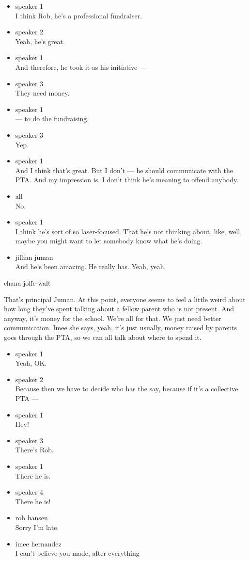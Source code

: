 \begin{itemize}
\item
  speaker 1\\
  I think Rob, he's a professional fundraiser.
\item
  speaker 2\\
  Yeah, he's great.
\item
  speaker 1\\
  And therefore, he took it as his initiative ---
\item
  speaker 3\\
  They need money.
\item
  speaker 1\\
  --- to do the fundraising.
\item
  speaker 3\\
  Yep.
\item
  speaker 1\\
  And I think that's great. But I don't --- he should communicate with
  the PTA. And my impression is, I don't think he's meaning to offend
  anybody.
\item
  all\\
  No.
\item
  speaker 1\\
  I think he's sort of so laser-focused. That he's not thinking about,
  like, well, maybe you might want to let somebody know what he's doing.
\item
  jillian juman\\
  And he's been amazing. He really has. Yeah, yeah.
\end{itemize}

chana joffe-walt

That's principal Juman. At this point, everyone seems to feel a little
weird about how long they've spent talking about a fellow parent who is
not present. And anyway, it's money for the school. We're all for that.
We just need better communication. Imee she says, yeah, it's just
usually, money raised by parents goes through the PTA, so we can all
talk about where to spend it.

\begin{itemize}
\item
  speaker 1\\
  Yeah, OK.
\item
  speaker 2\\
  Because then we have to decide who has the say, because if it's a
  collective PTA ---
\item
  speaker 1\\
  Hey!
\item
  speaker 3\\
  There's Rob.
\item
  speaker 1\\
  There he is.
\item
  speaker 4\\
  There he is!
\item
  rob hansen\\
  Sorry I'm late.
\item
  imee hernandez\\
  I can't believe you made, after everything ---
\end{itemize}

